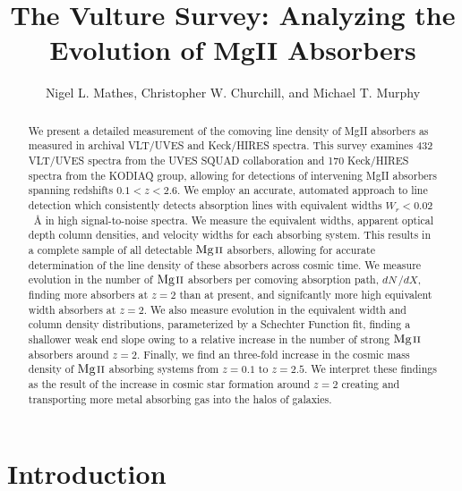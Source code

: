 \documentclass[iop,apj,numberedappendix,appendixfloats,twocolappendix]{emulateapj}
\begin{document}
\title{The Vulture Survey: Analyzing the Evolution of MgII Absorbers}

\author{
Nigel L. Mathes,
Christopher W. Churchill,
and
Michael T. Murphy
}


\begin{abstract}
We present a detailed measurement of the comoving line density of MgII absorbers as measured in archival VLT/UVES and Keck/HIRES spectra. This survey examines 432 VLT/UVES spectra from the UVES SQUAD collaboration and 170 Keck/HIRES spectra from the KODIAQ group, allowing for detections of intervening MgII absorbers spanning redshifts $0.1 < z < 2.6$. We employ an accurate, automated approach to line detection which consistently detects absorption lines with equivalent widths $W_r < 0.02$~{\AA} in high signal-to-noise spectra. We measure the equivalent widths, apparent optical depth column densities, and velocity widths for each absorbing system. This results in a complete sample of all detectable ${\hbox{{\rm Mg}\kern 0.1em{\sc ii}}}$ absorbers, allowing for accurate determination of the line density of these absorbers across cosmic time. We measure evolution in the number of ${\hbox{{\rm Mg}\kern 0.1em{\sc ii}}}$ absorbers per comoving absorption path, $dN\,/dX$, finding more absorbers at $z = 2$ than at present, and signifcantly more high equivalent width absorbers at $z = 2$. We also measure evolution in the equivalent width and column density distributions, parameterized by a Schechter Function fit, finding a shallower weak end slope owing to a relative increase in the number of strong ${\hbox{{\rm Mg}\kern 0.1em{\sc ii}}}$ absorbers around $z = 2$. Finally, we find an three-fold increase in the cosmic mass density of ${\hbox{{\rm Mg}\kern 0.1em{\sc ii}}}$ absorbing systems from $z = 0.1$ to $z = 2.5$. We interpret these findings as the result of the increase in cosmic star formation around $z = 2$ creating and transporting more metal absorbing gas into the halos of galaxies.

\end{abstract}



\section{Introduction}
\label{sec:intro}
\end{document}
